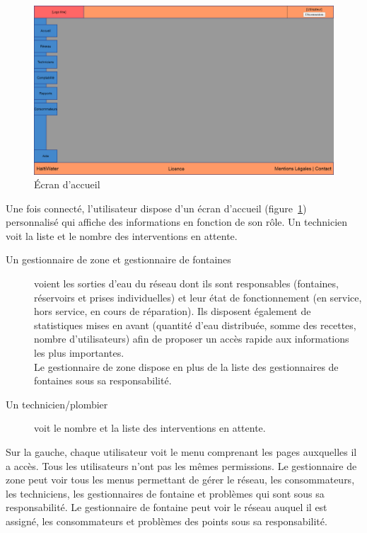 \documentclass[a4paper, 11pt]{article}
\begin{document}
    \begin{figure}[H]
        \includegraphics[width=\textwidth]{Cahier_des_Charges/accueil} %
        \caption{\'Ecran d'accueil}
        \label{fig:dashboard}
    \end{figure}

    Une fois connecté, l'utilisateur dispose d'un écran d'accueil (figure~\ref{fig:dashboard}) personnalisé qui affiche des informations en fonction de son rôle. Un technicien voit la liste et le nombre des interventions en attente.
    \begin{description}
      \item[Un gestionnaire de zone et gestionnaire de fontaines] voient les sorties d'eau du réseau dont ils sont responsables (fontaines, réservoirs et prises individuelles) et leur état de fonctionnement (en service, hors service, en cours de réparation). Ils disposent également de statistiques mises en avant (quantité d'eau distribuée, somme des recettes, nombre d'utilisateurs) afin de proposer un accès rapide aux informations les plus importantes.\\
      Le gestionnaire de zone dispose en plus de la liste des gestionnaires de fontaines sous sa responsabilité.
      \item[Un technicien/plombier] voit le nombre et la liste des interventions en attente.
    \end{description}
    Sur la gauche, chaque utilisateur voit le menu comprenant les pages auxquelles il a accès. Tous les utilisateurs n'ont pas les mêmes permissions. Le gestionnaire de zone peut voir tous les menus permettant de gérer le réseau, les consommateurs, les techniciens, les gestionnaires de fontaine et problèmes qui sont sous sa responsabilité. Le gestionnaire de fontaine peut voir le réseau auquel il est assigné, les consommateurs et problèmes des points sous sa responsabilité.
\end{document}
